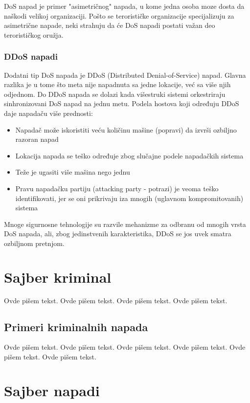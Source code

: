 \documentclass[a4paper]{article}
\begin{document}
DoS napad je primer "asimetričnog" napada, u kome jedna osoba moze dosta da naškodi velikoj organizaciji. Pošto se terorističke organizacije specijalizuju za asimetrične napade, neki strahuju da će DoS napadi postati važan deo terorističkog oružja.

\subsubsection{DDoS napadi}
\label{subsubsec:DDoS}

Dodatni tip DoS napada je DDoS (Distributed Denial-of-Service) napad. Glavna razlika je u tome što meta nije napadnuta sa jedne lokacije, već sa više njih odjednom. Do DDoS napada se dolazi kada višestruki sistemi orkestriraju sinhronizovani DoS napad na jednu metu. Podela hostova koji određuju DDoS daje napadaču više prednosti:
\begin{itemize}
\item Napadač može iskoristiti veću količinu mašine (popravi) da izvrši ozbiljno razoran napad
\item Lokacija napada se teško određuje zbog slučajne podele napadačkih sistema
\item Teže je ugasiti više mašina nego jednu
\item Pravu napadačku partiju (attacking party - potrazi) je veoma teško identifikovati, jer se oni prikrivaju iza mnogih (uglavnom kompromitovanih) sistema
\end{itemize}

Mnoge sigurnosne tehnologije su razvile mehanizme za odbranu od mnogih vrsta DoS napada, ali, zbog jedinstvenih karakteristika, DDoS se jos uvek smatra ozbiljnom pretnjom.

\section{Sajber kriminal}
\label{sec:sajber_kriminal}

Ovde pišem tekst. 
Ovde pišem tekst. 
Ovde pišem tekst. 
Ovde pišem tekst. 

\subsection{Primeri kriminalnih napada}
\label{subsec:primeri_krimi_napada}

Ovde pišem tekst. 
Ovde pišem tekst. 
Ovde pišem tekst. 
Ovde pišem tekst. 
Ovde pišem tekst. 
Ovde pišem tekst. 

\section{Sajber napadi}
\label{sec:sajber_napadi}
\end{document}
